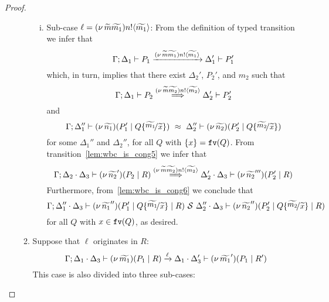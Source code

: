 \begin{proof}
\begin{enumerate}[I.]
\begin{enumerate}[1.]
\begin{enumerate}[i.]
					\item	Sub-case $\ell = (\nu\, \widetilde{m}\widetilde{m_1}) n ! \langle \widetilde{m_1} \rangle$:
 From the definition of typed transition we infer that
							\[
								\Gamma; \Delta_1 \vdash P_1 \xrightarrow{(\nu\, \widetilde{m}\widetilde{m_1}) n ! \langle \widetilde{m_1} \rangle} \Delta_1' \vdash P_1'
							\]
							which, in turn, implies that there exist $\Delta_2'$, $P_2'$, and $m_2$ such that
							\begin{equation}
							\Gamma; \Delta_1 \vdash P_2 \stackrel{(\nu\, \widetilde{m}\widetilde{m_2}) n ! \langle \widetilde{m_2} \rangle}{\Longrightarrow} \Delta_2' \vdash P_2'
								\label{lem:wbc_is_cong5}
								\end{equation}
								and
								\begin{equation}
							\horel{\Gamma}{\Delta_1''}{\newsp{\widetilde{n_1}}{P_1' \Par Q \subst{\widetilde{m_1}}{\widetilde{x}}}}
								{\ \wbc\ }
								{\Delta_2''}{\newsp{\widetilde{n_2}}{P_2' \Par Q \subst{\widetilde{m_2}}{\widetilde{x}}}}
								\label{lem:wbc_is_cong6}
							\end{equation}
						 for some $\Delta_1''$ and $\Delta_2''$, 
						 for all $Q$ with $\{x\} = \mathtt{fv}(Q)$.
						\noi From transition~\eqref{lem:wbc_is_cong5} we infer that 
						\[
							\Gamma; \Delta_2 \cdot \Delta_3 \vdash (\nu\, \widetilde{n_2}')(P_2 \;|\; R) \stackrel{(\nu\, \widetilde{m}\widetilde{m_2}) n ! \langle \widetilde{m_2} \rangle}{\Longrightarrow} \Delta_2' \cdot \Delta_3 \vdash (\nu\, \widetilde{n_2}''')(P_2' \;|\; R)
						\]
						\noi Furthermore, from~\eqref{lem:wbc_is_cong6} we conclude that 
						\[
							\horel{\Gamma}{\Delta_1'' \cat \Delta_3}{\newsp{\widetilde{n_1}''}{P_1' \Par Q \subst{\widetilde{m_1}}{\widetilde{x}} \Par R}}
							{\ \mathcal{S}\ }
							{\Delta_2'' \cat \Delta_3}{\newsp{\widetilde{n_2}''}{P_2' \Par Q \subst{\widetilde{m_2}}{\widetilde{x}} \Par R}}
						\]
					for all $Q$ with $x \in \mathtt{fv}(Q)$, as desired.
				\end{enumerate}

		\item Suppose that $\ell$ originates in $R$:
				\[
					\Gamma; \Delta_1 \cdot \Delta_3 \vdash (\nu\, \widetilde{m_1})(P_1 \;|\; R) \xrightarrow{\ell} \Delta_1 \cdot \Delta_3' \vdash (\nu\, \widetilde{m_1}')(P_1 \;|\; R')
				\]
				\noi This case is also divided into three sub-cases:


\end{enumerate}
\end{enumerate}
\end{proof}
